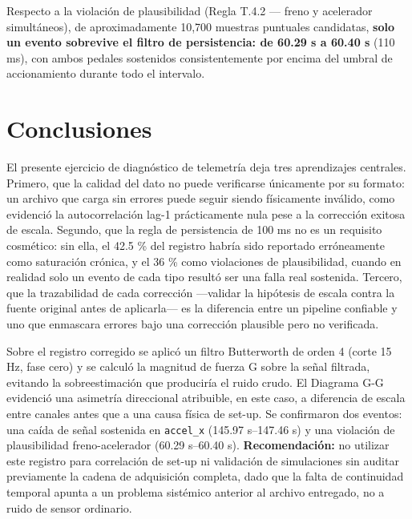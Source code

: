 \documentclass[12pt, letterpaper]{article}
\begin{document}
	Respecto a la violación de plausibilidad (Regla T.4.2 — freno y acelerador simultáneos), de aproximadamente 10,700 muestras puntuales candidatas, \textbf{solo un evento sobrevive el filtro de persistencia: de 60.29 s a 60.40 s} (110 ms), con ambos pedales sostenidos consistentemente por encima del umbral de accionamiento durante todo el intervalo.
	
	\section{Conclusiones}
	El presente ejercicio de diagnóstico de telemetría deja tres aprendizajes centrales. Primero, que la calidad del dato no puede verificarse únicamente por su formato: un archivo que carga sin errores puede seguir siendo físicamente inválido, como evidenció la autocorrelación lag-1 prácticamente nula pese a la corrección exitosa de escala. Segundo, que la regla de persistencia de 100 ms no es un requisito cosmético: sin ella, el 42.5 \% del registro habría sido reportado erróneamente como saturación crónica, y el 36 \% como violaciones de plausibilidad, cuando en realidad solo un evento de cada tipo resultó ser una falla real sostenida. Tercero, que la trazabilidad de cada corrección —validar la hipótesis de escala contra la fuente original antes de aplicarla— es la diferencia entre un pipeline confiable y uno que enmascara errores bajo una corrección plausible pero no verificada.
	
	Sobre el registro corregido se aplicó un filtro Butterworth de orden 4 (corte 15 Hz, fase cero) y se calculó la magnitud de fuerza G sobre la señal filtrada, evitando la sobreestimación que produciría el ruido crudo. El Diagrama G-G evidenció una asimetría direccional atribuible, en este caso, a diferencia de escala entre canales antes que a una causa física de set-up. Se confirmaron dos eventos: una caída de señal sostenida en \texttt{accel\_x} (145.97 s--147.46 s) y una violación de plausibilidad freno-acelerador (60.29 s--60.40 s). \textbf{Recomendación:} no utilizar este registro para correlación de set-up ni validación de simulaciones sin auditar previamente la cadena de adquisición completa, dado que la falta de continuidad temporal apunta a un problema sistémico anterior al archivo entregado, no a ruido de sensor ordinario.
	
\end{document}
